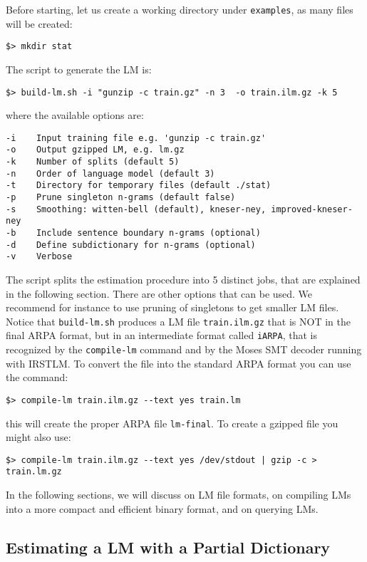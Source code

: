 \documentclass[11pt]{article}
\begin{document}
\noindent
Before starting, let us create a working directory under {\tt examples}, as many files will be created:

\begin{verbatim}
$> mkdir stat
\end{verbatim}

The script to generate the LM is:

\begin{verbatim}
$> build-lm.sh -i "gunzip -c train.gz" -n 3  -o train.ilm.gz -k 5
\end{verbatim}
where the available options are:

\begin{verbatim}
-i    Input training file e.g. 'gunzip -c train.gz'
-o    Output gzipped LM, e.g. lm.gz
-k    Number of splits (default 5)
-n    Order of language model (default 3)
-t    Directory for temporary files (default ./stat)
-p    Prune singleton n-grams (default false)
-s    Smoothing: witten-bell (default), kneser-ney, improved-kneser-ney 
-b    Include sentence boundary n-grams (optional)
-d    Define subdictionary for n-grams (optional)
-v    Verbose
\end{verbatim}

\noindent
The script splits the estimation procedure into 5 distinct jobs, that are explained in
the following section. There are other options that can be used. We recommend for instance to use pruning of singletons to get smaller LM files. 
Notice that {\tt build-lm.sh} produces a LM file {\tt train.ilm.gz} that is NOT in the final ARPA format, but in
an intermediate format called {\tt iARPA}, that is recognized by the {\tt compile-lm} 
command and by the Moses SMT decoder running with IRSTLM. 
To convert the file into the standard ARPA format you can use the command:

\begin{verbatim}
$> compile-lm train.ilm.gz --text yes train.lm 
\end{verbatim}
this will create the proper ARPA file {\tt lm-final}.
To create a gzipped file you might also use:
\begin{verbatim}
$> compile-lm train.ilm.gz --text yes /dev/stdout | gzip -c > train.lm.gz
\end{verbatim}


\noindent
In the following sections, we will discuss on LM file formats, on compiling LMs into a 
more compact and efficient binary format, and on querying LMs.

\subsection{Estimating a LM with a Partial Dictionary}
\end{document}
